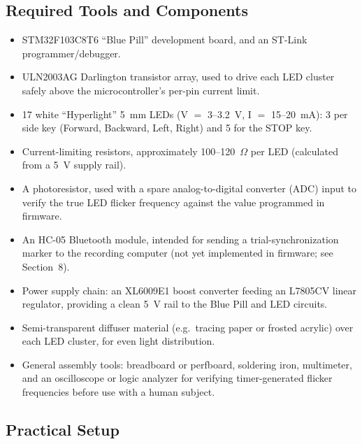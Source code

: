 \documentclass[11pt]{article}
\begin{document}
\subsection{Required Tools and Components}

\begin{itemize}
  \item STM32F103C8T6 ``Blue Pill'' development board, and an ST-Link programmer/debugger.
  \item ULN2003AG Darlington transistor array, used to drive each LED cluster safely above the microcontroller's per-pin current limit.
  \item 17 white ``Hyperlight'' 5~mm LEDs (V $=$ 3--3.2~V, I $=$ 15--20~mA): 3 per side key (Forward, Backward, Left, Right) and 5 for the STOP key.
  \item Current-limiting resistors, approximately 100--120~$\Omega$ per LED (calculated from a 5~V supply rail).
  \item A photoresistor, used with a spare analog-to-digital converter (ADC) input to verify the true LED flicker frequency against the value programmed in firmware.
  \item An HC-05 Bluetooth module, intended for sending a trial-synchronization marker to the recording computer (not yet implemented in firmware; see Section~8).
  \item Power supply chain: an XL6009E1 boost converter feeding an L7805CV linear regulator, providing a clean 5~V rail to the Blue Pill and LED circuits.
  \item Semi-transparent diffuser material (e.g.\ tracing paper or frosted acrylic) over each LED cluster, for even light distribution.
  \item General assembly tools: breadboard or perfboard, soldering iron, multimeter, and an oscilloscope or logic analyzer for verifying timer-generated flicker frequencies before use with a human subject.
\end{itemize}

\subsection{Practical Setup}
\end{document}
